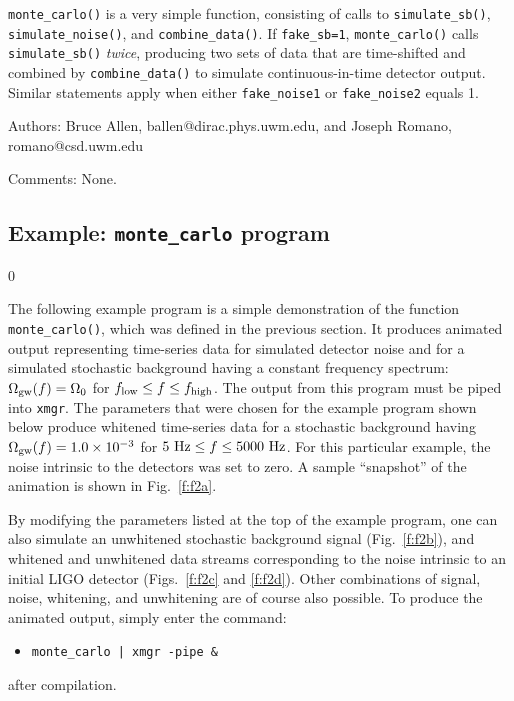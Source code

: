 {\tt monte\_carlo()} is a very simple function, consisting of calls to 
{\tt simulate\_sb()}, {\tt simulate\_noise()}, and {\tt combine\_data()}.
If {\tt fake\_sb=1}, {\tt monte\_carlo()} calls {\tt simulate\_sb()} 
{\it twice}, producing two sets of data that are time-shifted and 
combined by {\tt combine\_data()} to simulate continuous-in-time detector 
output.
Similar statements apply when either {\tt fake\_noise1} or 
{\tt fake\_noise2} equals 1.
%
\begin{description}
\item{Authors:}
Bruce Allen, ballen@dirac.phys.uwm.edu, and Joseph Romano, romano@csd.uwm.edu
\item{Comments:}
None.
\end{description}
\clearpage

\subsection{Example: {\tt monte\_carlo} program}
\label{subsec:example_monte_carlo}
\setcounter{equation}0

The following example program is a simple demonstration of the function
{\tt monte\_carlo()}, which was defined in the previous section.
It produces animated output representing 
time-series data for simulated detector noise and for a simulated 
stochastic background having a constant frequency spectrum:
$\Omega_{\rm gw}(f)=\Omega_0$ for $f_{\rm low}\le f\le f_{\rm high}$.
The output from this program must be piped into {\tt xmgr}.
The parameters that were chosen for the example program shown below 
produce whitened time-series data for a stochastic background having
$\Omega_{\rm gw}(f)=1.0\times 10^{-3}$ for 
$5\ {\rm Hz}\le f\le 5000\ {\rm Hz}$.
For this particular example, the noise intrinsic to the detectors was
set to zero.
A sample ``snapshot'' of the animation is shown in Fig.~\ref{f:f2a}.

By modifying the parameters listed at the top of the example program,
one can also simulate an unwhitened stochastic background signal 
(Fig.~\ref{f:f2b}), and whitened and unwhitened data streams corresponding 
to the noise intrinsic to an initial LIGO detector (Figs.~\ref{f:f2c} and 
\ref{f:f2d}).
Other combinations of signal, noise, whitening, and unwhitening are 
of course also possible.
To produce the animated output, simply enter the command:
%
\begin{itemize}
\item[]{\tt monte\_carlo | xmgr -pipe \&} 
\end{itemize}
%
after compilation.

